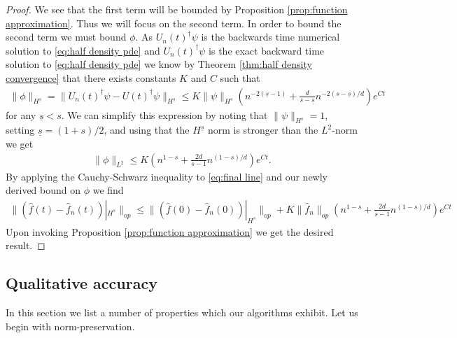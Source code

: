 \documentclass[final,leqno]{siamltex1213}
\begin{document}
\begin{proof}
	We see that the first term will be bounded by Proposition \ref{prop:function approximation}. Thus we will focus on the second term.
	In order to bound the second term we must bound $\phi$.
	As $U_{n}(t)^{\dagger} \psi$ is the backwards time numerical solution to \eqref{eq:half density pde}
	and $U_{n}(t)^{\dagger}\psi$ is the exact backward time solution to \eqref{eq:half density pde} we know by Theorem \ref{thm:half density convergence} that
	there exists constants $K$ and $C$ such that
	\begin{align}
		\| \phi \|_{H^{\underline{s}}} = \| U_{n}(t)^{\dagger} \psi - U(t)^{\dagger} \psi \|_{H^{\underline{s}}}  \leq K \| \psi \|_{H^{s}} \left(  n^{-2(\underline{s}-1)} + \frac{d}{s - \underline{s}} n^{-2(s-\underline{s})/d} \right) e^{Ct} 
	\end{align}
	for any $\underline{s} <s$.
	We can simplify this expression by noting that $\| \psi \|_{H^{s}} = 1$, setting $\underline{s} = (1+s)/2$, and using that the $H^{\underline{s}}$ norm is stronger than the $L^{2}$-norm we get
	\begin{align}
		 \| \phi \|_{L^{2}}  \leq  K \left(  n^{1-s} + \frac{2d}{s -1} n^{(1-s)/d} \right) e^{Ct}.
	\end{align}
	By applying the Cauchy-Schwarz inequality to \eqref{eq:final line} and our newly derived bound on $\phi$ we find
	\begin{align}
		\| ( \hat{f}(t) - \hat{f}_{n}(t))|_{H^{s}} \|_{op} \leq \| ( \hat{f}(0) - \hat{f}_{n}(0) )|_{H^{s}} \|_{op} +  K \| \hat{f}_{n} \|_{op} \left( n^{1-s} + \frac{2d}{s -1} n^{(1-s)/d} \right) e^{Ct}
	\end{align}
	Upon invoking Proposition \ref{prop:function approximation} we get the desired result.
\end{proof}


\subsection{Qualitative accuracy}
In this section we list a number of properties which our algorithms exhibit.  Let us begin with norm-preservation.
\end{document}
